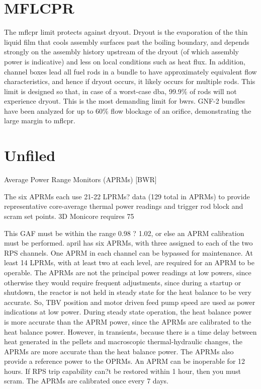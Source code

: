 \documentclass[10pt]{article}
\begin{document}
\section{MFLCPR}

The \gls{mflcpr} limit protects against dryout. Dryout is the evaporation of the thin liquid film that cools assembly surfaces past the boiling boundary, and depends strongly on the assembly history upstream of the dryout (of which assembly power is indicative) and less on local conditions such as heat flux. In addition, channel boxes lead all fuel rods in a bundle to have approximately equivalent flow characteristics, and hence if dryout occurs, it likely occurs for multiple rods. This limit is designed so that, in case of a worst-case \gls{dba}, 99.9\% of rods will not experience dryout. This is the most demanding limit for \gls{bwr}s. GNF-2 bundles have been analyzed for up to 60\% flow blockage of an orifice, demonstrating the large margin to \gls{mflcpr}. 




\section{Unfiled}

Average Power Range Monitors (APRMs) [BWR]

The six APRMs each use 21-22 LPRMs? data (129 total in APRMs) to provide representative core-average thermal power readings and trigger rod block and scram set points. 3D Monicore requires 75%



This GAF must be within the range 0.98 ? 1.02, or else an APRM calibration must be performed. april has six APRMs, with three assigned to each of the two RPS channels. One APRM in each channel can be bypassed for maintenance. At least 14 LPRMs, with at least two at each level, are required for an APRM to be operable. The APRMs are not the principal power readings at low powers, since otherwise they would require frequent adjustments, since during a startup or shutdown, the reactor is not held in steady state for the heat balance to be very accurate. So, TBV position and motor driven feed pump speed are used as power indications at low power. During steady state operation, the heat balance power is more accurate than the APRM power, since the APRMs are calibrated to the heat balance power. However, in transients, because there is a time delay between heat generated in the pellets and macroscopic thermal-hydraulic changes, the APRMs are more accurate than the heat balance power. The APRMs also provide a reference power to the OPRMs. An APRM can be inoperable for 12 hours. If RPS trip capability can?t be restored within 1 hour, then you must scram. The APRMs are calibrated once every 7 days. 
\end{document}
